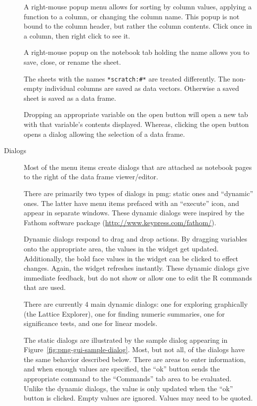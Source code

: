\documentclass[12pt]{article}
\begin{document}
\begin{description}
  A right-mouse popup menu allows for sorting by column
  values, applying a function to a column, or changing the column
  name. This popup is not bound to the column header, but rather the
  column contents. Click once in a column, then right click to see it.

  A right-mouse popup on the notebook tab holding the name allows you to save, close,
  or rename the sheet.

  The sheets with the names \verb+*scratch:#*+ are treated
  differently. The non-empty individual columns are saved as data
  vectors. Otherwise a saved sheet is saved  as a data frame.

  Dropping an appropriate variable on the open button will open a new tab
  with that variable's contents displayed. Whereas, clicking the open
  button opens a dialog allowing the selection of a data frame.

  
\item[Dialogs] 
  Most of the menu items create dialogs that are attached as notebook
  pages to the right of the data frame viewer/editor. 
  
  There are primarily two types of dialogs in pmg: static ones and
  ``dynamic'' ones. The latter have menu items prefaced with an
  ``execute'' icon, and appear in separate windows. These dynamic
  dialogs were inspired by the Fathom software package
  (\url{http://www.keypress.com/fathom/}).
  
  Dynamic dialogs respond to drag and drop actions. By dragging
  variables onto the appropriate area, the values in the widget get
  updated. Additionally, the bold face values in the widget can be
  clicked to effect changes. Again, the widget refreshes instantly.
  These dynamic dialogs give immediate feedback, but do not show or
  allow one to edit the R commands that are used.

  There are currently 4 main dynamic dialogs: one for exploring
  graphically (the Lattice Explorer), one for finding numeric
  summaries, one for significance tests, and one for linear models.
  

  The static dialogs are illustrated by the sample dialog appearing in
  Figure~\ref{fig:pmg-gui-sample-dialog}. Most, but not all, of the dialogs
  have the same behavior described below. There are areas to enter
  information, and when enough values are specified, the ``ok'' button
  sends the appropriate command to the ``Commands'' tab area to be evaluated.
  Unlike the dynamic dialogs, the value is only updated when the
  ``ok'' button is clicked.  Empty values are ignored. Values may
  need to be quoted. 


\end{description}
\end{document}
